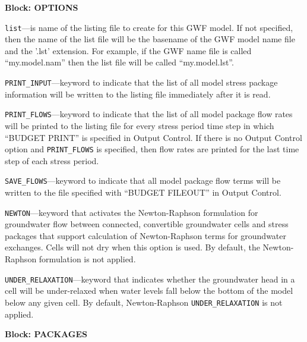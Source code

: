 
\item \textbf{Block: OPTIONS}

\begin{description}
\item \texttt{list}---is name of the listing file to create for this GWF model.  If not specified, then the name of the list file will be the basename of the GWF model name file and the '.lst' extension.  For example, if the GWF name file is called ``my.model.nam'' then the list file will be called ``my.model.lst''.

\item \texttt{PRINT\_INPUT}---keyword to indicate that the list of all model stress package information will be written to the listing file immediately after it is read.

\item \texttt{PRINT\_FLOWS}---keyword to indicate that the list of all model package flow rates will be printed to the listing file for every stress period time step in which ``BUDGET PRINT'' is specified in Output Control.  If there is no Output Control option and \texttt{PRINT\_FLOWS} is specified, then flow rates are printed for the last time step of each stress period.

\item \texttt{SAVE\_FLOWS}---keyword to indicate that all model package flow terms will be written to the file specified with ``BUDGET FILEOUT'' in Output Control.

\item \texttt{NEWTON}---keyword that activates the Newton-Raphson formulation for groundwater flow between connected, convertible groundwater cells and stress packages that support calculation of Newton-Raphson terms for groundwater exchanges. Cells will not dry when this option is used. By default, the Newton-Raphson formulation is not applied.

\item \texttt{UNDER\_RELAXATION}---keyword that indicates whether the groundwater head in a cell will be under-relaxed when water levels fall below the bottom of the model below any given cell. By default, Newton-Raphson \texttt{UNDER\_RELAXATION} is not applied.

\end{description}
\item \textbf{Block: PACKAGES}

